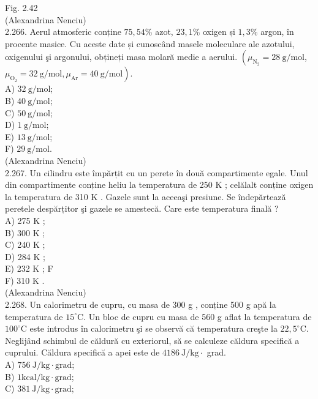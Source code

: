 \documentclass[10pt]{article}
\begin{document}
Fig. 2.42\\
(Alexandrina Nenciu)\\
2.266. Aerul atmosferic conține $75,54 \%$ azot, $23,1 \%$ oxigen și $1,3 \%$ argon, în procente masice. Cu aceste date și cunoscând masele moleculare ale azotului, oxigenului şi argonului, obțineți masa molară medie a aerului. $\left(\mu_{\mathrm{N}_{2}}=28 \mathrm{~g} / \mathrm{mol}\right.$, $\left.\mu_{\mathrm{O}_{2}}=32 \mathrm{~g} / \mathrm{mol}, \mu_{\mathrm{Ar}}=40 \mathrm{~g} / \mathrm{mol}\right)$.\\
A) $32 \mathrm{~g} / \mathrm{mol}$;\\
B) $40 \mathrm{~g} / \mathrm{mol}$;\\
C) $50 \mathrm{~g} / \mathrm{mol}$;\\
D) $1 \mathrm{~g} / \mathrm{mol}$;\\
E) $13 \mathrm{~g} / \mathrm{mol}$;\\
F) $29 \mathrm{~g} / \mathrm{mol}$.\\
(Alexandrina Nenciu)\\
2.267. Un cilindru este împărțit cu un perete în două compartimente egale. Unul din compartimente conține heliu la temperatura de 250 K ; celălalt conține oxigen la temperatura de 310 K . Gazele sunt la aceeaşi presiune. Se îndepărtează peretele despărțitor şi gazele se amestecă. Care este temperatura finală ?\\
A) 275 K ;\\
B) 300 K ;\\
C) 240 K ;\\
D) 284 K ;\\
E) 232 K ; F\\
F) 310 K .\\
(Alexandrina Nenciu)\\
2.268. Un calorimetru de cupru, cu masa de 300 g , conține 500 g apă la temperatura de $15^{\circ} \mathrm{C}$. Un bloc de cupru cu masa de 560 g aflat la temperatura de $100^{\circ} \mathrm{C}$ este introdus în calorimetru şi se observă că temperatura creşte la $22,5^{\circ} \mathrm{C}$. Neglijând schimbul de căldură cu exteriorul, să se calculeze căldura specifică a cuprului. Căldura specifică a apei este de $4186 \mathrm{~J} / \mathrm{kg} \cdot$ grad.\\
A) $756 \mathrm{~J} / \mathrm{kg} \cdot \mathrm{grad}$;\\
B) $1 \mathrm{kcal} / \mathrm{kg} \cdot \mathrm{grad}$;\\
C) $381 \mathrm{~J} / \mathrm{kg} \cdot \mathrm{grad}$;\\
\end{document}
